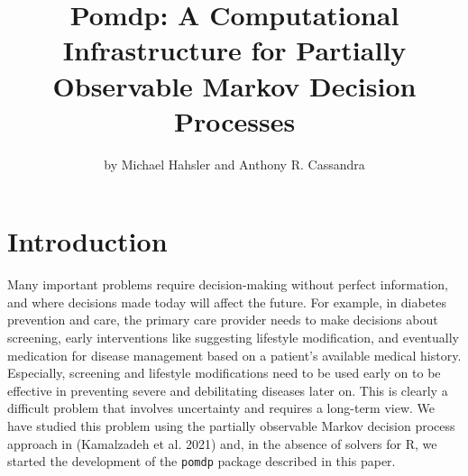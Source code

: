 \title{Pomdp: A Computational Infrastructure for Partially Observable Markov Decision Processes}
\author{by Michael Hahsler and Anthony R. Cassandra}

\maketitle


\hypertarget{introduction}{%
\section{Introduction}\label{introduction}}

Many important problems require decision-making without perfect information,
and where decisions made today will affect the future.
For example, in diabetes prevention and care, the primary care
provider needs to make decisions about screening, early interventions
like suggesting lifestyle modification, and eventually
medication for disease management
based on a patient's available medical history. Especially,
screening and lifestyle modifications need to be used early on to
be effective in preventing severe and debilitating diseases later on.
This is clearly a difficult problem that involves uncertainty and
requires a long-term view. We have studied this problem
using the partially observable Markov decision process approach in
(Kamalzadeh et al. 2021) and, in the absence of solvers for R,
we started the development of the \texttt{pomdp}
package described in this paper.

